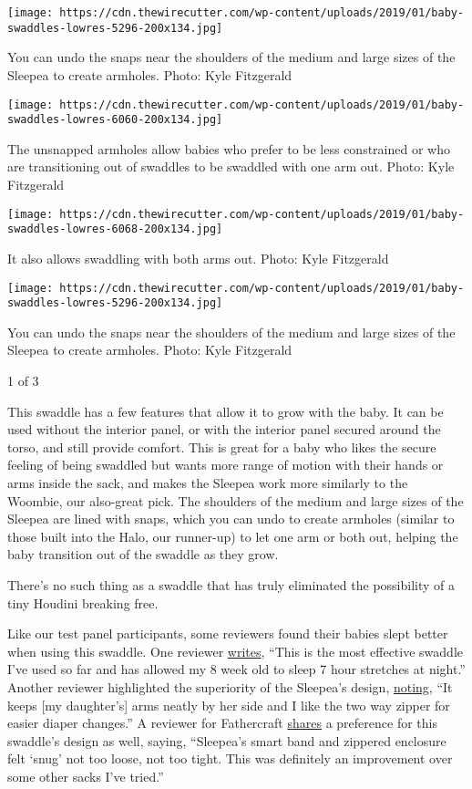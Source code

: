 \texttt{[image: https://cdn.thewirecutter.com/wp-content/uploads/2019/01/baby-swaddles-lowres-5296-200x134.jpg]}

You can undo the snaps near the shoulders of the medium and large sizes
of the Sleepea to create armholes. Photo: Kyle Fitzgerald

\texttt{[image: https://cdn.thewirecutter.com/wp-content/uploads/2019/01/baby-swaddles-lowres-6060-200x134.jpg]}

The unsnapped armholes allow babies who prefer to be less constrained or
who are transitioning out of swaddles to be swaddled with one arm out.
Photo: Kyle Fitzgerald

\texttt{[image: https://cdn.thewirecutter.com/wp-content/uploads/2019/01/baby-swaddles-lowres-6068-200x134.jpg]}

It also allows swaddling with both arms out. Photo: Kyle Fitzgerald

\texttt{[image: https://cdn.thewirecutter.com/wp-content/uploads/2019/01/baby-swaddles-lowres-5296-200x134.jpg]}

You can undo the snaps near the shoulders of the medium and large sizes
of the Sleepea to create armholes. Photo: Kyle Fitzgerald

1 of 3

This swaddle has a few features that allow it to grow with the baby. It
can be used without the interior panel, or with the interior panel
secured around the torso, and still provide comfort. This is great for a
baby who likes the secure feeling of being swaddled but wants more range
of motion with their hands or arms inside the sack, and makes the
Sleepea work more similarly to the Woombie, our also-great pick. The
shoulders of the medium and large sizes of the Sleepea are lined with
snaps, which you can undo to create armholes (similar to those built
into the Halo, our runner-up) to let one arm or both out, helping the
baby transition out of the swaddle as they grow.

There's no such thing as a swaddle that has truly eliminated the
possibility of a tiny Houdini breaking free.

Like our test panel participants, some reviewers found their babies
slept better when using this swaddle. One reviewer
\href{https://www.amazon.com/gp/customer-reviews/R1ZTRGEH3B6MNO/ref=cm_cr_arp_d_rvw_ttl?ie=UTF8\&ASIN=B079H8PS8P\&tag=thewire06-20\&linkCode=xm2\&ascsubtag=YT78495}{writes},
``This is the most effective swaddle I've used so far and has allowed my
8 week old to sleep 7 hour stretches at night.'' Another reviewer
highlighted the superiority of the Sleepea's design,
\href{https://www.amazon.com/gp/customer-reviews/R34YWZN7FCU88Q/ref=cm_cr_arp_d_rvw_ttl?ie=UTF8\&ASIN=B079H8PS8P\&tag=thewire06-20\&linkCode=xm2\&ascsubtag=YT78495}{noting},
``It keeps {[}my daughter's{]} arms neatly by her side and I like the
two way zipper for easier diaper changes.'' A reviewer for Fathercraft
\href{https://fathercraft.com/sleepea-review/}{shares} a preference for
this swaddle's design as well, saying, ``Sleepea's smart band and
zippered enclosure felt `snug' not too loose, not too tight. This was
definitely an improvement over some other sacks I've tried.''


